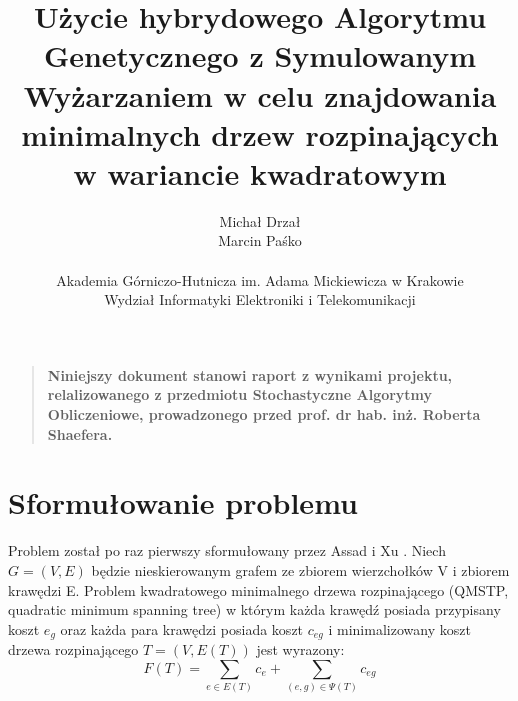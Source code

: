 \documentclass[12pt]{article}
\title{Użycie hybrydowego Algorytmu Genetycznego z Symulowanym Wyżarzaniem w celu znajdowania minimalnych drzew rozpinających w wariancie kwadratowym}
\author
{Michał Drzał\\Marcin Paśko\\
\\
\normalsize{Akademia Górniczo-Hutnicza im. Adama Mickiewicza w Krakowie}\\
\normalsize{Wydział Informatyki Elektroniki i Telekomunikacji}\\
}
\date{}
\newenvironment{sciabstract}{%
\begin{quote} \bf}
{\end{quote}}
\begin{document}
 


\baselineskip24pt


\maketitle 




\begin{sciabstract}
  Niniejszy dokument stanowi raport z wynikami projektu, relalizowanego z przedmiotu Stochastyczne Algorytmy Obliczeniowe, prowadzonego przed prof. dr hab. inż. Roberta Shaefera.
\end{sciabstract}




\section*{Sformułowanie problemu}

Problem został po raz pierwszy sformułowany przez Assad i Xu \Cite{Assad}. Niech $G =(V,E)$ będzie nieskierowanym grafem ze zbiorem wierzchołków V i zbiorem krawędzi E. Problem kwadratowego minimalnego drzewa rozpinającego (QMSTP, quadratic minimum spanning tree) w którym każda krawędź posiada przypisany koszt $e_{g}$ oraz każda para krawędzi posiada koszt $c_{eg}$ i minimalizowany koszt drzewa rozpinającego $T= (V, E(T))$ jest wyrazony:
$$ F(T) = \sum_{e \in E(T) } c_e + \sum_{(e,g) \in \Psi (T)} c_{eg} $$
\end{document}
